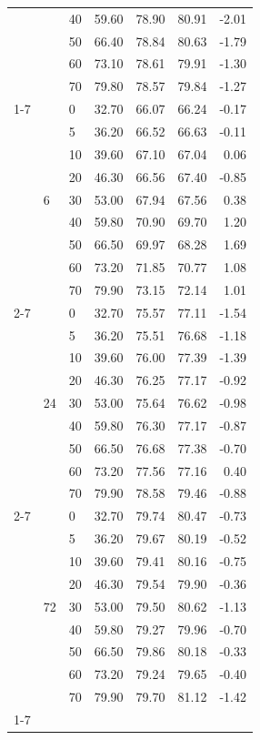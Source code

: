 \begin{table}
\begin{tabular}{lllrrrr}
 &  & 40 & 59.60 & 78.90 & 80.91 & -2.01 \\
 &  & 50 & 66.40 & 78.84 & 80.63 & -1.79 \\
 &  & 60 & 73.10 & 78.61 & 79.91 & -1.30 \\
 &  & 70 & 79.80 & 78.57 & 79.84 & -1.27 \\
\cline{1-7} \cline{2-7}
\multirow[t]{27}{*}{out} & \multirow[t]{9}{*}{6} & 0 & 32.70 & 66.07 & 66.24 & -0.17 \\
 &  & 5 & 36.20 & 66.52 & 66.63 & -0.11 \\
 &  & 10 & 39.60 & 67.10 & 67.04 & 0.06 \\
 &  & 20 & 46.30 & 66.56 & 67.40 & -0.85 \\
 &  & 30 & 53.00 & 67.94 & 67.56 & 0.38 \\
 &  & 40 & 59.80 & 70.90 & 69.70 & 1.20 \\
 &  & 50 & 66.50 & 69.97 & 68.28 & 1.69 \\
 &  & 60 & 73.20 & 71.85 & 70.77 & 1.08 \\
 &  & 70 & 79.90 & 73.15 & 72.14 & 1.01 \\
\cline{2-7}
 & \multirow[t]{9}{*}{24} & 0 & 32.70 & 75.57 & 77.11 & -1.54 \\
 &  & 5 & 36.20 & 75.51 & 76.68 & -1.18 \\
 &  & 10 & 39.60 & 76.00 & 77.39 & -1.39 \\
 &  & 20 & 46.30 & 76.25 & 77.17 & -0.92 \\
 &  & 30 & 53.00 & 75.64 & 76.62 & -0.98 \\
 &  & 40 & 59.80 & 76.30 & 77.17 & -0.87 \\
 &  & 50 & 66.50 & 76.68 & 77.38 & -0.70 \\
 &  & 60 & 73.20 & 77.56 & 77.16 & 0.40 \\
 &  & 70 & 79.90 & 78.58 & 79.46 & -0.88 \\
\cline{2-7}
 & \multirow[t]{9}{*}{72} & 0 & 32.70 & 79.74 & 80.47 & -0.73 \\
 &  & 5 & 36.20 & 79.67 & 80.19 & -0.52 \\
 &  & 10 & 39.60 & 79.41 & 80.16 & -0.75 \\
 &  & 20 & 46.30 & 79.54 & 79.90 & -0.36 \\
 &  & 30 & 53.00 & 79.50 & 80.62 & -1.13 \\
 &  & 40 & 59.80 & 79.27 & 79.96 & -0.70 \\
 &  & 50 & 66.50 & 79.86 & 80.18 & -0.33 \\
 &  & 60 & 73.20 & 79.24 & 79.65 & -0.40 \\
 &  & 70 & 79.90 & 79.70 & 81.12 & -1.42 \\
\cline{1-7} \cline{2-7}
\bottomrule
\end{tabular}
\end{table}
